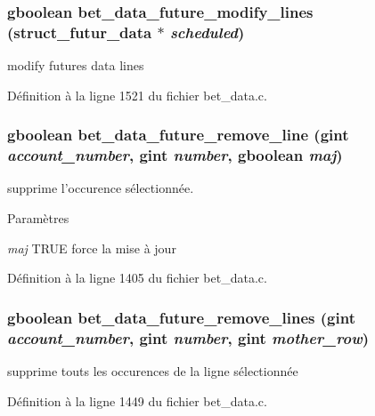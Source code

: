 \subsubsection[{bet\_\-data\_\-future\_\-modify\_\-lines}]{\setlength{\rightskip}{0pt plus 5cm}gboolean bet\_\-data\_\-future\_\-modify\_\-lines ({\bf struct\_\-futur\_\-data} $\ast$ {\em scheduled})}\label{bet__data_8c_aa5807c7bbe8349ad4e5d0377d897092d}
modify futures data lines 

Définition à la ligne 1521 du fichier bet\_\-data.c.

\subsubsection[{bet\_\-data\_\-future\_\-remove\_\-line}]{\setlength{\rightskip}{0pt plus 5cm}gboolean bet\_\-data\_\-future\_\-remove\_\-line (gint {\em account\_\-number}, \/  gint {\em number}, \/  gboolean {\em maj})}\label{bet__data_8c_a5feeffaadf0363f8d23e005000bb8518}
supprime l'occurence sélectionnée.


\begin{DoxyParams}{Paramètres}
\item[{\em maj}]TRUE force la mise à jour \end{DoxyParams}


Définition à la ligne 1405 du fichier bet\_\-data.c.

\subsubsection[{bet\_\-data\_\-future\_\-remove\_\-lines}]{\setlength{\rightskip}{0pt plus 5cm}gboolean bet\_\-data\_\-future\_\-remove\_\-lines (gint {\em account\_\-number}, \/  gint {\em number}, \/  gint {\em mother\_\-row})}\label{bet__data_8c_ab7c4f2f8f73676c85d7b5b8412833c2d}
supprime touts les occurences de la ligne sélectionnée 

Définition à la ligne 1449 du fichier bet\_\-data.c.

